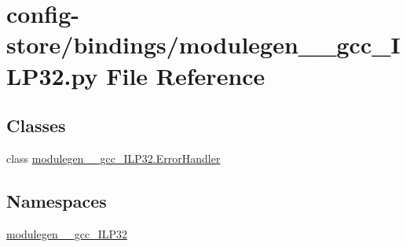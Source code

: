 \hypertarget{config-store_2bindings_2modulegen____gcc__ILP32_8py}{}\section{config-\/store/bindings/modulegen\+\_\+\+\_\+gcc\+\_\+\+I\+L\+P32.py File Reference}
\label{config-store_2bindings_2modulegen____gcc__ILP32_8py}
\subsection*{Classes}
\begin{DoxyCompactItemize}
\item 
class \hyperlink{classmodulegen____gcc__ILP32_1_1ErrorHandler}{modulegen\+\_\+\+\_\+gcc\+\_\+\+I\+L\+P32.\+Error\+Handler}
\end{DoxyCompactItemize}
\subsection*{Namespaces}
\begin{DoxyCompactItemize}
\item 
 \hyperlink{namespacemodulegen____gcc__ILP32}{modulegen\+\_\+\+\_\+gcc\+\_\+\+I\+L\+P32}
\end{DoxyCompactItemize}
